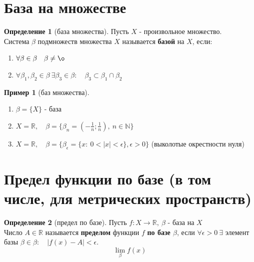 \documentclass{report}
\theoremstyle{definition}
\newtheorem*{definition}{Определение}
\newtheorem*{example}{Пример}
\begin{document}
\section{База на множестве}

\begin{definition}[база множества]
    Пусть $X$ - произвольное множество.\\

    Система $\beta$ подмножеств множества $X$ называется \textbf{базой} на $X$, если:
    \begin{enumerate}
        \item $\forall \beta \in \beta \quad \beta \ne \o$
        \item $\forall \beta_{1}, \beta_{2} \in \beta \ \exists \beta_{3} \in \beta: \quad \beta_{3} \subset \beta_{1}
                  \cap \beta_{2}$
    \end{enumerate}
\end{definition}

\begin{example}[баз множества]
    \begin{enumerate}
        \item $\beta = \{X\}$ - база
        \item $X = \mathbb{R}, \quad \beta = \{\beta_{n} = (-\frac{1}{n};\frac{1}{n}), \ n \in \mathbb{N}\}$
        \item $X = \mathbb{R}, \quad \beta = \{\beta_{\epsilon} = \{x: \  0 < |x| < \epsilon\}, \epsilon > 0\}$
              (выколотые окрестности нуля)
    \end{enumerate}
\end{example}

\section{Предел функции по базе (в том числе, для метрических пространств)}

\begin{definition}[предел по базе]
    Пусть $f:X\rightarrow\mathbb{R}, \ \beta$ - база на $X$\\

    Число $A\in\mathbb{R}$ называется \textbf{пределом} функции $f$ \textbf{по базе $\beta$}, если
    $\forall \epsilon > 0 \ \exists$ элемент базы $\beta \in \beta: \quad |f(x) - A| < \epsilon$.
    \begin{equation*}
        \underset{\beta}{\lim} f(x)
    \end{equation*}
\end{definition}
\end{document}
